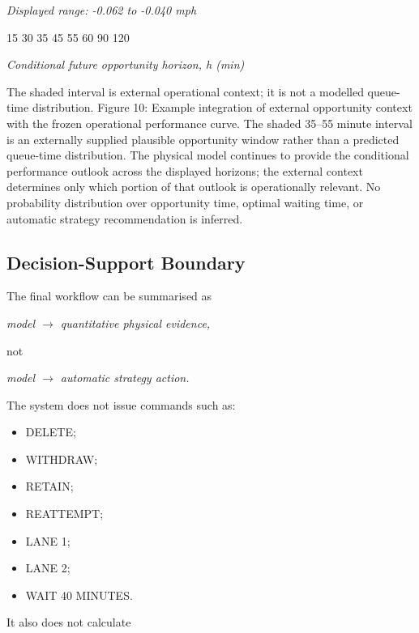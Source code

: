 \begin{center}\textit{Displayed range: -0.062 to -0.040 mph}\end{center}

15 30 35 45 55 60 90 120

\begin{center}\textit{Conditional future opportunity horizon, h (min)}\end{center}

The shaded interval is external operational context; it is not a modelled queue-time distribution. Figure 10: Example integration of external opportunity context with the frozen operational performance curve. The shaded 35--55 minute interval is an externally supplied plausible opportunity window rather than a predicted queue-time distribution. The physical model continues to provide the conditional performance outlook across the displayed horizons; the external context determines only which portion of that outlook is operationally relevant. No probability distribution over opportunity time, optimal waiting time, or automatic strategy recommendation is inferred.

\subsection{Decision-Support Boundary}
The final workflow can be summarised as

\begin{center}\textit{model \ensuremath{\rightarrow} quantitative physical evidence,}\end{center}

not

\begin{center}\textit{model \ensuremath{\rightarrow} automatic strategy action.}\end{center}

The system does not issue commands such as:

\begin{itemize}
\item DELETE;
\item WITHDRAW;
\item RETAIN;
\item REATTEMPT;
\item LANE 1;
\item LANE 2;
\item WAIT 40 MINUTES.
\end{itemize}

It also does not calculate

